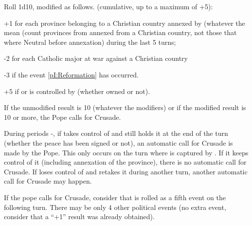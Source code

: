 \bparag Roll 1d10, modified as follows.
\bparag[Modifiers] (cumulative, up to a maximum of +5):
\begin{modlist}
\item[+1] for each province belonging to a Christian country annexed by \TUR
  (whatever the mean (count provinces from \regionBalkans annexed from a
  Christian country, not those that where Neutral before annexation) during
  the last 5 turns;
\item[-2] for each Catholic major at war against a Christian country
\item[-3] if the event \ref{pI:Reformation} has occurred.
\item[+5] if \villeVienne or \villeRoma is controlled by \TUR (whether owned
  or not).
\end{modlist}
\bparag If the unmodified result is 10 (whatever the modifiers) or if the
modified result is 10 or more, the Pope calls for Crusade.

\aparag[\villeRoma] During periods -, if \TUR takes
control of \villeRoma and still holds it at the end of the turn (whether the
peace has been signed or not), an automatic call for Crusade is made by the
Pope.
\bparag This only occurs on the turn where \villeRoma is captured by \TUR. If
it keeps control of it (including annexation of the province), there is no
automatic call for Crusade. If \TUR loses control of \villeRoma and retakes it
during another turn, another automatic call for Crusade may happen.

\aparag[Crusade] If the pope calls for Crusade, consider that
 is rolled as a fifth event on the following turn. There
may be only 4 other political events (no extra event, consider that a ``+1''
result was already obtained).

